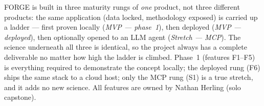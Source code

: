 \preparedby

FORGE is built in three maturity rungs of \emph{one} product, not three different products: the same application (data locked, methodology exposed) is carried up a ladder --- first proven locally (\emph{MVP --- phase~1}), then deployed (\emph{MVP --- deployed}), then optionally opened to an LLM agent (\emph{Stretch --- MCP}). The science underneath all three is identical, so the project always has a complete deliverable no matter how high the ladder is climbed. Phase~1 (features F1--F5) is everything required to demonstrate the concept locally; the deployed rung (F6) ships the same stack to a cloud host; only the MCP rung (S1) is a true stretch, and it adds no new science. All features are owned by Nathan Herling (solo capstone).

